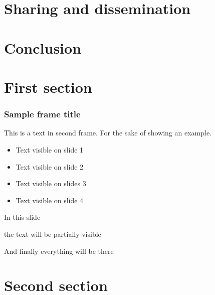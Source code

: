 \documentclass{beamer}
\begin{document}
\section{Sharing and dissemination}

\label{Conclusion}
\section{Conclusion}


\section{First section}

\begin{frame}
\frametitle{Sample frame title}
This is a text in second frame. For the sake of showing an example.

\begin{itemize}
    \item<1-> Text visible on slide 1
    \item<2-> Text visible on slide 2
    \item<3> Text visible on slides 3
    \item<4-> Text visible on slide 4
\end{itemize}
\end{frame}



\begin{frame}
In this slide \pause

the text will be partially visible \pause

And finally everything will be there
\end{frame}

\section{Second section}
\end{document}
